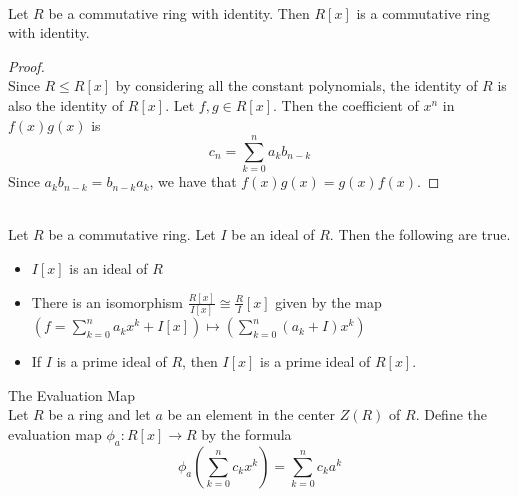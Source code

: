 \documentclass[a4paper]{article}
\begin{document}
\begin{lmm}{}{}\\
Let $R$ be a commutative ring with identity. Then $R[x]$ is a commutative ring with identity. 
\begin{proof}\\
Since $R\leq R[x]$ by considering all the constant polynomials, the identity of $R$ is also the identity of $R[x]$. Let $f,g\in R[x]$. Then the coefficient of $x^n$ in $f(x)g(x)$ is $$c_n=\sum_{k=0}^na_kb_{n-k}$$ Since $a_kb_{n-k}=b_{n-k}a_k$, we have that $f(x)g(x)=g(x)f(x)$. 
\end{proof}
\end{lmm}

\begin{prp}{}{}\\
Let $R$ be a commutative ring. Let $I$ be an ideal of $R$. Then the following are true. 
\begin{itemize}
\item $I[x]$ is an ideal of $R$
\item There is an isomorphism $\frac{R[x]}{I[x]}\cong\frac{R}{I}[x]$ given by the map $\left(f=\sum_{k=0}^na_kx^k+I[x]\right)\mapsto\left(\sum_{k=0}^n(a_k+I)x^k\right)$
\item If $I$ is a prime ideal of $R$, then $I[x]$ is a prime ideal of $R[x]$. 
\end{itemize}
\end{prp}

\begin{defn}{The Evaluation Map}{}\\
Let $R$ be a ring and let $a$ be an element in the center $Z(R)$ of $R$. Define the evaluation map $\phi_a:R[x]\to R$ by the formula $$\phi_a\left(\sum_{k=0}^nc_kx^k\right)=\sum_{k=0}^nc_ka^k$$
\end{defn}
\end{document}

